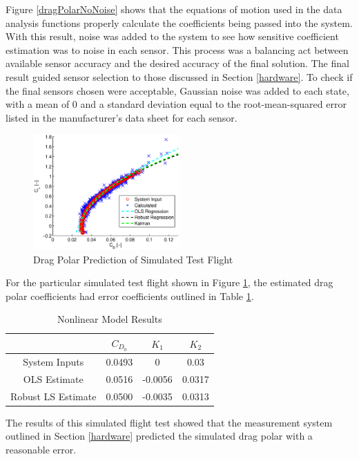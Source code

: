 Figure \ref{dragPolarNoNoise} shows that the equations of motion used in the data analysis functions properly calculate the coefficients being passed into the system. With this result, noise was added to the system to see how sensitive coefficient estimation was to noise in each sensor. This process was a balancing act between available sensor accuracy and the desired accuracy of the final solution. The final result guided sensor selection to those discussed in Section \ref{hardware}. To check if the final sensors chosen were acceptable, Gaussian noise was added to each state, with a mean of $0$ and a standard deviation equal to the root-mean-squared error listed in the manufacturer's data sheet for each sensor.
\begin{figure}[H]

  \centering
    \includegraphics[width=0.5\textwidth]{figures/simDragPolarNoise.eps}
      \caption{Drag Polar Prediction of Simulated Test Flight} \label{dragPolarNoise}
\end{figure}

For the particular simulated test flight shown in Figure \ref{dragPolarNoise}, the estimated drag polar coefficients had error coefficients outlined in Table \ref{simCoeffErrorTable}.

\begin{table}[ht]
\caption{Nonlinear Model Results} %
\centering %
\begin{tabular}{c c c c} %
\hline\hline %
 & $C_{D_0}$ & $K_1$ & $K_2$ \\ [0.5ex] %
\hline %
System Inputs & 0.0493 & 0 & 0.03 \\ %
OLS Estimate & 0.0516 & -0.0056 & 0.0317 \\
Robust LS Estimate & 0.0500 & -0.0035 & 0.0313 \\ [1ex] %
\hline %
\end{tabular}
\label{simCoeffErrorTable} %
\end{table}

The results of this simulated flight test showed that the measurement system outlined in Section \ref{hardware} predicted the simulated drag polar with a reasonable error.